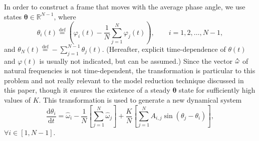 \documentclass[numbers]{frontiersSCNS}
\renewcommand{\vec}[1]{\bm{#1}}
\newcommand{\diff}{\mathrm{d}}  %
\newcommand{\defeq}{\stackrel{\mathrm{def}}{=} }  %
\newcommand{\numNodes}{{N}}
\newcommand{\couplingK}{{K}}
\begin{document}
In order to construct a frame that moves with the average phase angle,
we use states $\vec{\theta} \in \mathbb R^{\numNodes-1}$,
where
\begin{equation}
 \label{eqn:thetaDefinition}
\theta_i(t) \defeq
\left(
    \varphi_i(t) - \frac{1}{\numNodes} \sum_{j=1}^{\numNodes} \varphi_j(t)
\right),
\quad\quad
i = 1,2, \ldots, \numNodes-1,
\end{equation}
and
$\theta_\numNodes(t) \defeq -\sum_{j=1}^{\numNodes-1} \theta_j(t)$.
%
(Hereafter, explicit time-dependence of $\theta(t)$ and $\varphi(t)$
is usually not indicated, but can be assumed.)
%
Since the vector $\vec\hat\omega$ of natural frequencies is not time-dependent,
the transformation is particular to this problem
and not really relevant to the model reduction technique discussed in this paper,
though it ensures the existence of a steady $\vec \theta$ state
for sufficiently high values of $\couplingK$.
%
This transformation is used to generate a new
dynamical system
\begin{equation}
    \label{eqn:trueRHS}
    \frac{\diff \theta_i}{\diff t}
    =
    \hat\omega_i
    -
    \frac{1}{\numNodes}
    \left[ 
    \sum_{j=1}^{\numNodes}
    \hat\omega_j \right]
    +
    \frac{\couplingK}{N}
    \left[
    \sum_{j=1}^{\numNodes}
    A_{i,j} \sin(\theta_j - \theta_i) \right]
    ,
\end{equation}
$\forall i\in[1, \numNodes-1]$.
\end{document}
